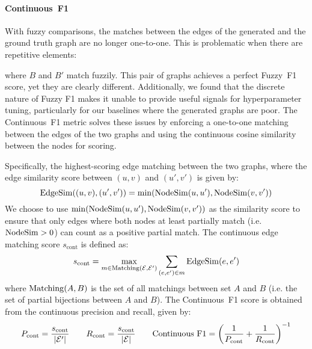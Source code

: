 \paragraph{Continuous~F1}
With fuzzy comparisons, the matches between the edges of the generated and the ground truth graph are no longer one-to-one. This is problematic when there are repetitive elements:
\begin{figure}[H]
    \centering
\end{figure}
\vspace{-1em}
where $B$ and $B'$ match fuzzily. This pair of graphs achieves a perfect Fuzzy~F1 score, yet they are clearly different. Additionally, we found that the discrete nature of Fuzzy F1 makes it unable to provide useful signals for hyperparameter tuning, particularly for our baselines where the generated graphs are poor. The Continuous~F1 metric solves these issues by enforcing a one-to-one matching between the edges of the two graphs and using the continuous cosine similarity between the nodes for scoring.

Specifically, the highest-scoring edge matching between the two graphs, where the edge similarity score between $(u, v)$ and $(u', v')$ is given by:
\[
    \operatorname{EdgeSim}((u, v), (u', v')) = \min(\operatorname{NodeSim}(u, u'), \operatorname{NodeSim}(v, v'))
\]
We choose to use $\min(\operatorname{NodeSim}(u, u'), \operatorname{NodeSim}(v, v'))$ as the similarity score to ensure that only edges where both nodes at least partially match (i.e. $\operatorname{NodeSim} > 0$) can count as a positive partial match. The continuous edge matching score $s_{\text{cont}}$ is defined as:
\[
    s_{\text{cont}} = \max_{m \in \operatorname{Matching}(\mathcal{E}, \mathcal{E}')} \sum_{(e, e') \in m} \operatorname{EdgeSim}(e, e')
\]
where $\operatorname{Matching}(A, B)$ is the set of all matchings between set $A$ and $B$ (i.e. the set of partial bijections between $A$ and $B$). The Continuous~F1 score is obtained from the continuous precision and recall, given by:
\[
    P_{\text{cont}} = \frac{s_{\text{cont}}}{|\mathcal{E}'|} \qquad
    R_{\text{cont}} = \frac{s_{\text{cont}}}{|\mathcal{E}|} \qquad
    \text{Continuous~F1} = \left(\frac{1}{P_{\text{cont}}} + \frac{1}{R_{\text{cont}}}\right)^{-1}
\]

